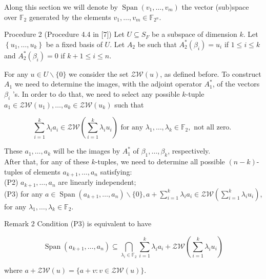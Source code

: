 \documentclass[10pt]{article}
\begin{document}
Along this section we will denote by $\operatorname{Span}\left(v_{1}, \ldots, v_{m}\right)$ the vector (sub)space over $\mathbb{F}_{2}$ generated by the elements $v_{1}, \ldots, v_{m} \in \mathbb{F}_{2^{n}}$.

Procedure 2 (Procedure 4.4 in [7]) Let $U \subseteq S_{F}$ be a subspace of dimension $k$. Let $\left\{u_{1}, \ldots, u_{k}\right\}$ be a fixed basis of $U$. Let $A_{2}$ be such that $A_{2}^{*}\left(\beta_{i}\right)=u_{i}$ if $1 \leq i \leq k$ and $A_{2}^{*}\left(\beta_{i}\right)=0$ if $k+1 \leq i \leq n$.

For any $u \in U \backslash\{0\}$ we consider the set $\mathcal{Z} \mathcal{W}(u)$, as defined before. To construct $A_{1}$ we need to determine the images, with the adjoint operator $A_{1}^{*}$, of the vectors $\beta_{i}$ 's. In order to do that, we need to select any possible $k$-tuple $a_{1} \in \mathcal{Z} \mathcal{W}\left(u_{1}\right), \ldots, a_{k} \in \mathcal{Z} \mathcal{W}\left(u_{k}\right)$ such that


\begin{equation*}
\sum_{i=1}^{k} \lambda_{i} a_{i} \in \mathcal{Z} \mathcal{W}\left(\sum_{i=1}^{k} \lambda_{i} u_{i}\right) \text { for any } \lambda_{1}, \ldots, \lambda_{k} \in \mathbb{F}_{2}, \text { not all zero. } \tag{P1}
\end{equation*}


These $a_{1}, \ldots, a_{k}$ will be the images by $A_{1}^{*}$ of $\beta_{1}, \ldots, \beta_{k}$, respectively.\\
After that, for any of these $k$-tuples, we need to determine all possible $(n-k)$-tuples of elements $a_{k+1}, \ldots, a_{n}$ satisfying:\\
(P2) $a_{k+1}, \ldots, a_{n}$ are linearly independent;\\
(P3) for any $a \in \operatorname{Span}\left(a_{k+1}, \ldots, a_{n}\right) \backslash\{0\}, a+\sum_{i=1}^{k} \lambda_{i} a_{i} \in \mathcal{Z} \mathcal{W}\left(\sum_{i=1}^{k} \lambda_{i} u_{i}\right)$, for any $\lambda_{1}, \ldots, \lambda_{k} \in \mathbb{F}_{2}$.

Remark 2 Condition (P3) is equivalent to have

$$
\operatorname{Span}\left(a_{k+1}, \ldots, a_{n}\right) \subseteq \bigcap_{\lambda_{i} \in \mathbb{F}_{2}} \sum_{i=1}^{k} \lambda_{i} a_{i}+\mathcal{Z} \mathcal{W}\left(\sum_{i=1}^{k} \lambda_{i} u_{i}\right)
$$

where $a+\mathcal{Z} \mathcal{W}(u)=\{a+v: v \in \mathcal{Z} \mathcal{W}(u)\}$.
\end{document}
